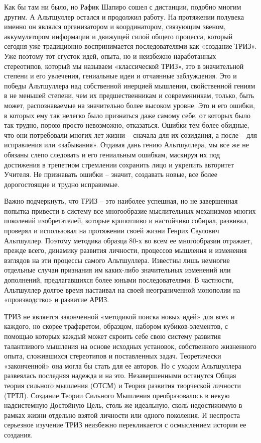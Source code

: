 \documentclass[11pt,a4paper]{article}
\begin{document}
Как бы там ни было, но Рафик Шапиро сошел с дистанции, подобно многим другим.
А Альтшуллер остался и продолжил работу. На протяжении полувека именно он
являлся организатором и координатором, связующим звеном, аккумулятором
информации и движущей силой общего процесса, который сегодня уже традиционно
воспринимается последователями как «создание ТРИЗ». Уже поэтому тот сгусток
идей, опыта, но и неизбежно наработанных стереотипов, который мы называем
«классической ТРИЗ», это в значительной степени и его увлечения, гениальные
идеи и отчаянные заблуждения. Это и победы Альтшуллера над собственной
инерцией мышления, свойственной гениям в не меньшей степени, чем их
предшественникам и современникам, только, быть может, распознаваемые на
значительно более высоком уровне. Это и его ошибки, в которых ему так нелегко
было признаться даже самому себе, от которых было так трудно, порою просто
невозможно, отказаться. Ошибки тем более обидные, что они потребовали многих
лет жизни -- сначала для их созидания, а после -- для исправления или
«забывания». Отдавая дань гению Альтшуллера, мы все же не обязаны слепо
следовать и его гениальным ошибкам, маскируя их под достижения в трепетном
стремлении сохранить лицо и укрепить авторитет Учителя. Не признавать ошибки
-- значит, создавать новые, все более дорогостоящие и трудно исправимые.

Важно подчеркнуть, что ТРИЗ -- это наиболее успешная, но не завершенная
попытка привести в систему все многообразие мыслительных механизмов многих
поколений изобретателей, которые кропотливо и настойчиво собирал, развивал,
проверял и использовал на протяжении своей жизни Генрих Саулович Альтшуллер.
Поэтому методика образца 80-х во всем ее многообразии отражает, прежде всего,
динамику развития личности, процессов мышления и изменения взглядов на эти
процессы самого Альтшуллера. Известны лишь немногие отдельные случаи признания
им каких-либо значительных изменений или дополнений, предлагавшихся более
юными последователями. В частности, Альтшуллер долгое время настаивал на своей
неограниченной монополии на «производство» и развитие АРИЗ.

ТРИЗ не является законченной «методикой поиска новых идей» для всех и каждого,
но скорее трафаретом, образцом, набором кубиков-элементов, с помощью которых
каждый может скроить себе свою систему развития талантливого мышления на
основе исходных установок, собственного жизненного опыта, сложившихся
стереотипов и поставленных задач. Теоретически «законченной» она могла бы
стать для ее авторов. Но с уходом Альтшуллера развеялась последняя надежда и
на это. Незавершенными останутся Общая теория сильного мышления (ОТСМ) и
Теория развития творческой личности (ТРТЛ). Создание Теории Сильного Мышления
преобразовалось в некую надсистемную Достойную Цель, столь же идеальную, сколь
недостижимую в рамках жизни отдельно взятой личности или одного поколения. И
неспроста серьезное изучение ТРИЗ неизбежно перекликается с осмыслением
истории ее создания.
\end{document}
